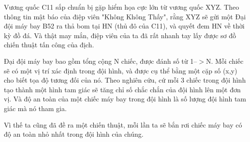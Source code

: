 Vương quốc C11 sắp chuẩn bị gặp hiểm họa cực lớn từ vương quốc XYZ. Theo thông tin mật báo của điệp viên "Không Không Thấy", rằng XYZ sẽ gửi một Đại đội máy bay B52 ra thả bom tại HN (thủ đô của C11), và quyết đem HN về thời kỳ đồ đá. Và thật may mắn, điệp viên của ta đã rất nhanh tay lấy được sơ đồ chiến thuật tấn công của địch.  

   Đại đội máy bay bao gồm tổng cộng N chiếc, được đánh số từ 1--$>$N. Mỗi chiếc sẽ có một vị trí xác định trong đội hình, và được cụ thể bằng một cặp số (x,y) cho biết tọa độ tương đối của nó. Theo nghiên cứu, cứ mỗi 3 chiếc trong đội hình tạo thành một hình tam giác sẽ tăng chỉ số chắc chắn của đội hình lên một đơn vị. Và độ an toàn của một chiếc máy bay trong đội hình là số lượng đội hình tam giác mà nó tham gia.  

   Vì thế ta cũng đã đề ra một chiến thuật, mỗi lần ta sẽ bắn rơi chiếc máy bay có độ an toàn nhỏ nhất trong đội hình của chúng.